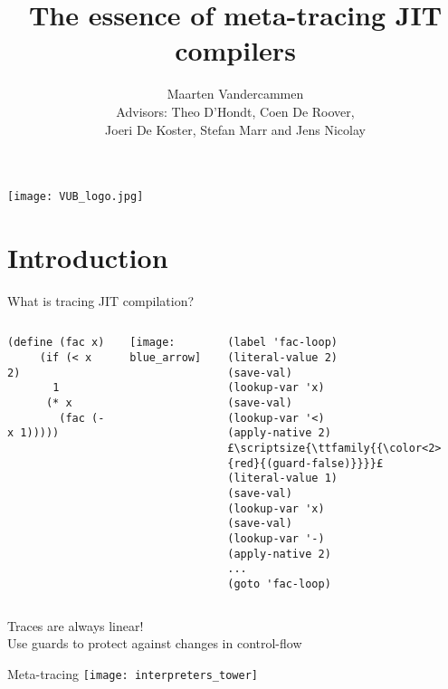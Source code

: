 \documentclass{beamer}
\title{The essence of meta-tracing JIT compilers}
\author{Maarten Vandercammen \\
		Advisors: Theo D'Hondt, Coen De Roover, \\
				  Joeri De Koster, Stefan Marr and Jens Nicolay}
\date{}
\begin{document}
\begin{frame}[plain]
\texttt{[image: VUB\_logo.jpg]}
\vspace{2cm}
\titlepage
\end{frame}

\section{Introduction}

\begin{frame}[fragile]{What is tracing JIT compilation?}

\hspace{0.45cm}
\begin{columns}[c]
	\begin{lstlisting}[basicstyle=\footnotesize]
	(define (fac x)
 	 (if (< x 2)
 	   1
  	  (* x
   	    (fac (- x 1))))) 
	\end{lstlisting}
	
\texttt{[image: blue\_arrow]}

	\begin{lstlisting}[basicstyle = \scriptsize\ttfamily, escapechar = £]
	(label 'fac-loop)
(literal-value 2)
(save-val)
(lookup-var 'x)
(save-val)
(lookup-var '<)
(apply-native 2)
£\scriptsize{\ttfamily{{\color<2>{red}{(guard-false)}}}}£
(literal-value 1)
(save-val)
(lookup-var 'x)
(save-val)
(lookup-var '-)
(apply-native 2)
...
(goto 'fac-loop)
	\end{lstlisting}
\end{columns}

\pause
Traces are always linear! \\
Use guards to protect against changes in control-flow

\end{frame}

\begin{frame}{Meta-tracing}
\centering
\texttt{[image: interpreters\_tower]}
\end{frame}
\end{document}
